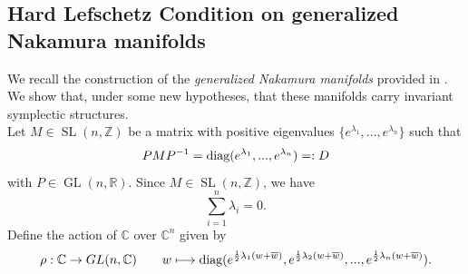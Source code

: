 \documentclass[a4paper, 11pt]{amsart}
\theoremstyle{plain}
\theoremstyle{definition}
\DeclareMathOperator{\GL}{GL}
\DeclareMathOperator{\SL}{SL}
\newcommand{\C}{\mathbb{C}}
\numberwithin{equation}{section}
\begin{document}
{\subsection{Hard Lefschetz Condition on generalized Nakamura manifolds}
We recall the construction of the \textit{generalized Nakamura manifolds} provided in \cite{CT}. We show that, under some new hypotheses, that these manifolds carry invariant symplectic structures. \\
Let $M \in \SL(n,\mathbb{Z})$ be a matrix with positive eigenvalues $\{e^{\lambda_{1}}, ..., e^{\lambda_{n}}\}$ such that
\begin{equation}
	PMP^{-1} = \hbox{diag}(e^{\lambda_{1}}, ..., e^{\lambda_{n}}) =: D
\end{equation}
with $P \in \GL(n,\mathbb{R})$. Since $M \in \SL(n, \mathbb{Z})$, we have
\[\sum_{i = 1}^n \lambda_i = 0.\]
Define the action of $\C$ over $\C^{n}$ given by
\[\rho : \mathbb{C} \rightarrow GL(n, \mathbb{C}) \qquad w \longmapsto \hbox{diag}(e^{\frac{1}{2}\lambda_{1}(w + \overline{w})}, e^{\frac{1}{2}\lambda_{2}(w + \overline{w})}, ..., e^{\frac{1}{2}\lambda_{n}(w + \overline{w})}).\]
}
\end{document}

